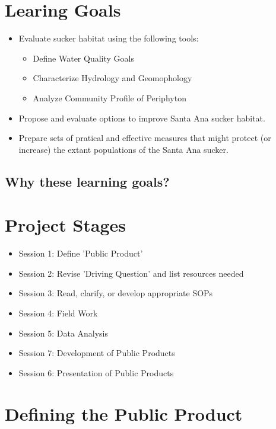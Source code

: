 \documentclass{article}\usepackage[]{graphicx}\usepackage[]{color}
\begin{document}
\section{Learing Goals}

\begin{itemize}
  \item Evaluate sucker habitat using the following tools:
  \begin{itemize}
    \item Define Water Quality Goals
    \item Characterize Hydrology and Geomophology
    \item Analyze Community Profile of Periphyton
  \end{itemize}
  \item Propose and evaluate options to improve Santa Ana sucker habitat.
  \item Prepare sets of pratical and effective measures that might protect (or increase) the extant populations of the Santa Ana sucker.
\end{itemize}

\subsection{Why these learning goals?}

\section{Project Stages}

\begin{itemize}
  \item Session 1: Define 'Public Product'
  \item Session 2: Revise 'Driving Question' and list resources needed
  \item Session 3: Read, clarify, or develop appropriate SOPs
  \item Session 4: Field Work
  \item Session 5: Data Analysis
  \item Session 7: Development of Public Products
  \item Session 6: Presentation of Public Products
\end{itemize}

\section{Defining the Public Product}
\end{document}
